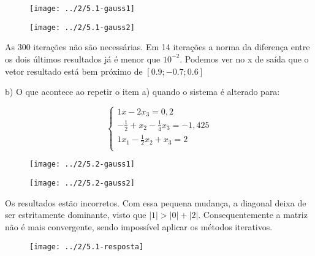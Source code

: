 \documentclass[leqno]{article}
\numberwithin{equation}{section}
\begin{document}
\begin{enumerate}
		\begin{figure}[H]
			\centering
			\texttt{[image: ../2/5.1-gauss1]}
		\end{figure}
		
		\begin{figure}[H]
			\centering
			\texttt{[image: ../2/5.1-gauss2]}
		\end{figure}
		
		As 300 iterações não são necessárias. Em 14 iterações a norma da diferença entre os dois últimos resultados já é menor que $10^{-2}$. Podemos ver no x de saída que o vetor resultado está bem próximo de $[0.9; -0.7; 0.6]$
		
		b) O que acontece ao repetir o item a) quando o sistema é
		alterado para:
		
		\begin{equation}
			\left\{\begin{split}
				1x- 2x_3 = 0,2 \\
				-\frac{1}{2} + x_2  - \frac{1}{4}x_3 = -1,425 \\
				1x_1 - \frac{1}{2}x_2 + x_3 = 2 \\
			\end{split}\right.
		\end{equation}
		
		\begin{sol}
			
		\begin{figure}[H]
			\centering
			\texttt{[image: ../2/5.2-gauss1]}
		\end{figure}
		
		\begin{figure}[H]
			\centering
			\texttt{[image: ../2/5.2-gauss2]}
		\end{figure}	
		
		Os resultados estão incorretos. Com essa pequena mudança, a diagonal deixa de ser estritamente dominante, visto que $|1| > |0| + |2|$. Consequentemente a matriz não é mais convergente, sendo impossível aplicar os métodos iterativos.
		
		\begin{figure}[H]
			\centering
			\texttt{[image: ../2/5.1-resposta]}
		\end{figure}
		\end{sol}
		
		

\end{enumerate}
\end{document}
